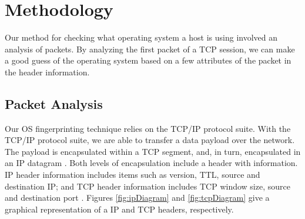 
\section{Methodology}

Our method for checking what operating system a host is using involved an analysis of packets. By analyzing the first packet of a TCP session, we can make a good guess of the operating system based on a few attributes of the packet in the header information.

\subsection{Packet Analysis}

Our OS fingerprinting technique relies on the TCP/IP protocol suite.  With the TCP/IP protocol suite, we are able to transfer a data payload over the network.  The payload is encapsulated within a TCP segment, and, in turn, encapsulated in an IP datagram \cite{tcpip}.  Both levels of encapsulation include a header with information.  IP header information includes items such as version, TTL, source and destination IP; and TCP header information includes TCP window size, source and destination port \cite{header}. Figures \ref{fig:ipDiagram} and \ref{fig:tcpDiagram} give a graphical representation of a IP and TCP headers, respectively.

